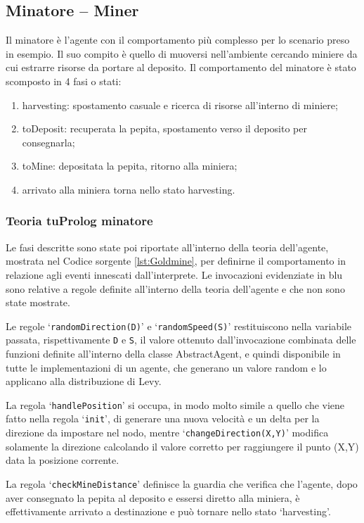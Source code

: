 \subsection{Minatore -- Miner}
Il minatore è l'agente con il comportamento più complesso per lo scenario preso in esempio.
Il suo compito è quello di muoversi nell'ambiente cercando miniere da cui estrarre risorse da portare al deposito.
Il comportamento del minatore è stato scomposto in 4 fasi o stati:
\begin{enumerate}
\item harvesting: spostamento casuale e ricerca di risorse all'interno di miniere;
\item toDeposit: recuperata la pepita, spostamento verso il deposito per consegnarla;
\item toMine: depositata la pepita, ritorno alla miniera;
\item arrivato alla miniera torna nello stato harvesting.
\end{enumerate}

\subsubsection{Teoria tuProlog minatore}
Le fasi descritte sono state poi riportate all'interno della teoria dell'agente, mostrata nel Codice sorgente \ref{lst:Goldmine}, per definirne il comportamento in relazione agli eventi innescati dall'interprete. Le invocazioni evidenziate in blu sono relative a regole definite all'interno della teoria dell'agente e che non sono state mostrate.

Le regole `\texttt{randomDirection(D)}' e `\texttt{randomSpeed(S)}' restituiscono nella variabile passata, rispettivamente \texttt{D} e \texttt{S}, il valore ottenuto dall'invocazione combinata delle funzioni definite all'interno della classe AbstractAgent, e quindi disponibile in tutte le implementazioni di un agente, che generano un valore random e lo applicano alla distribuzione di Levy.

La regola `\texttt{handlePosition}' si occupa, in modo molto simile a quello che viene fatto nella regola `\texttt{init}', di generare una nuova velocità e un delta per la direzione da impostare nel nodo, mentre `\texttt{changeDirection(X,Y)}' modifica solamente la direzione calcolando il valore corretto per raggiungere il punto (X,Y) data la posizione corrente.

La regola `\texttt{checkMineDistance}' definisce la guardia che verifica che l'agente, dopo aver consegnato la pepita al deposito e essersi diretto alla miniera, è effettivamente arrivato a destinazione e può tornare nello stato `harvesting'.


